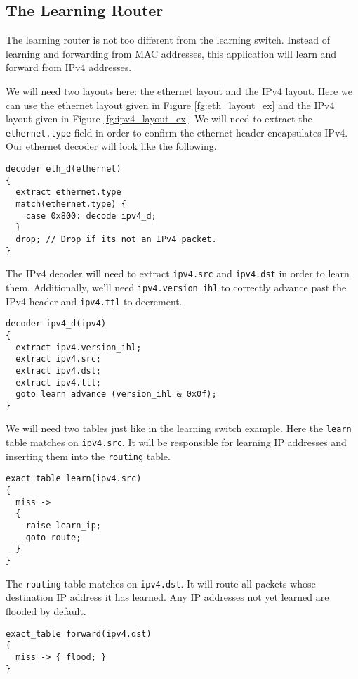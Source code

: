 \subsection{The Learning Router} \label{learning_router}

The learning router is not too different from the learning switch. Instead of learning and forwarding from MAC addresses, this application will learn and forward from IPv4 addresses.

We will need two layouts here: the ethernet layout and the IPv4 layout. Here we can use the ethernet layout given in Figure \ref{fg:eth_layout_ex} and the IPv4 layout given in Figure \ref{fg:ipv4_layout_ex}. We will need to extract the \texttt{ethernet.type} field in order to confirm the ethernet header encapsulates IPv4. Our ethernet decoder will look like the following.
\begin{lstlisting}
decoder eth_d(ethernet)
{
  extract ethernet.type
  match(ethernet.type) {
  	case 0x800: decode ipv4_d;
  }
  drop; // Drop if its not an IPv4 packet.
}
\end{lstlisting}

The IPv4 decoder will need to extract \texttt{ipv4.src} and \texttt{ipv4.dst} in order to learn them. Additionally, we'll need \texttt{ipv4.version\_ihl} to correctly advance past the IPv4 header and \texttt{ipv4.ttl} to decrement.

\begin{lstlisting}
decoder ipv4_d(ipv4)
{
  extract ipv4.version_ihl;
  extract ipv4.src;
  extract ipv4.dst;
  extract ipv4.ttl;
  goto learn advance (version_ihl & 0x0f);
}
\end{lstlisting}

We will need two tables just like in the learning switch example. Here the \texttt{learn} table matches on \texttt{ipv4.src}. It will be responsible for learning IP addresses and inserting them into the \texttt{routing} table.

\begin{lstlisting}
exact_table learn(ipv4.src)
{
  miss ->
  {
	raise learn_ip;
    goto route;
  }
}
\end{lstlisting}

The \texttt{routing} table matches on \texttt{ipv4.dst}. It will route all packets whose destination IP address it has learned. Any IP addresses not yet learned are flooded by default.

\begin{lstlisting}
exact_table forward(ipv4.dst)
{
  miss -> { flood; }
}
\end{lstlisting}

